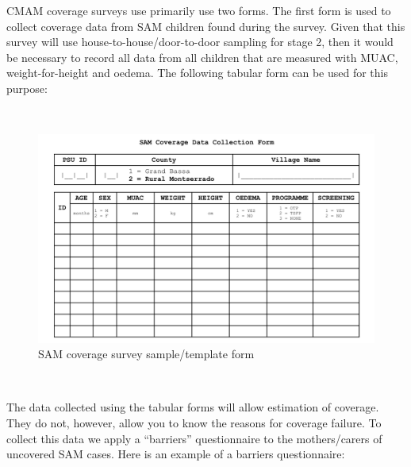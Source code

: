 \documentclass[12pt,a4paper]{book}
\theoremstyle{definition}
\theoremstyle{definition}
\theoremstyle{definition}
\theoremstyle{remark}
\begin{document}
CMAM coverage surveys use primarily use two forms. The first form is
used to collect coverage data from SAM children found during the survey.
Given that this survey will use house-to-house/door-to-door sampling for
stage 2, then it would be necessary to record all data from all children
that are measured with MUAC, weight-for-height and oedema. The following
tabular form can be used for this purpose:

~

\begin{figure}[H]

{\centering \includegraphics[width=29.11in]{forms/samForm} 

}

\caption{SAM coverage survey sample/template form}\label{fig:samform}
\end{figure}

~

The data collected using the tabular forms will allow estimation of
coverage. They do not, however, allow you to know the reasons for
coverage failure. To collect this data we apply a ``barriers''
questionnaire to the mothers/carers of uncovered SAM cases. Here is an
example of a barriers questionnaire:

~
\end{document}
